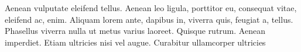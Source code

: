 Aenean vulputate eleifend tellus. Aenean leo
ligula, porttitor eu, consequat vitae, eleifend ac, enim. Aliquam lorem ante,
dapibus in, viverra quis, feugiat a, tellus. Phasellus viverra nulla ut metus
varius laoreet. Quisque rutrum. Aenean imperdiet. Etiam ultricies nisi vel
augue. Curabitur ullamcorper ultricies
